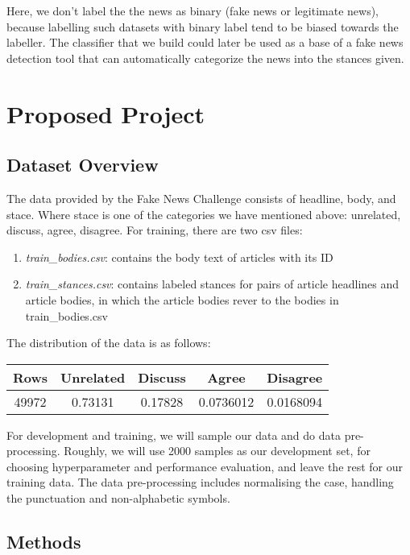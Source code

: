\documentclass[12pt]{article}
\begin{document}
Here, we don’t label the the news as binary (fake news or legitimate news),
because labelling such datasets with binary label tend to be biased towards 
the labeller. The classifier that we build could later be used as a base of a 
fake news detection tool that can automatically categorize the news into the 
stances given.

\section{Proposed Project}
\subsection{Dataset Overview}

The data provided by the Fake News Challenge consists of 
headline, body, and stace. 
Where stace is one of the categories we have mentioned above: 
unrelated, discuss, agree, disagree. 
For training, there are two csv files:
\begin{enumerate}
  \item \textit{train\_bodies.csv}: contains the body text of articles with its ID
  \item \textit{train\_stances.csv}: contains labeled stances for pairs of article 
      headlines and article bodies, in which the article bodies rever to the 
      bodies in train\_bodies.csv
\end{enumerate}

The distribution of the data is as follows:
\begin{center}
  \begin{tabular} 
    {|c|c|c|c|c|}
    \hline
    Rows & Unrelated & Discuss & Agree & Disagree \\
    \hline
    49972 & 0.73131 & 0.17828 & 0.0736012 & 0.0168094 \\
    \hline
  \end{tabular}
\end{center}

For development and training, we will sample our data and 
do data pre-processing.
Roughly, we will use 2000 samples as our development set, 
for choosing hyperparameter and performance evaluation, and leave the rest for 
our training data. 
The data pre-processing includes normalising the case, handling the punctuation
and non-alphabetic symbols.

\subsection{Methods}
\end{document}
